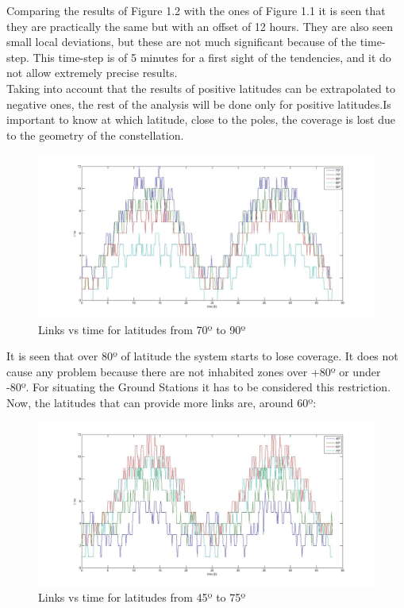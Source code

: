 Comparing the results of Figure 1.2 with the ones of Figure 1.1 it is seen that they are practically the same but with an offset of 12 hours. They are also seen small local deviations, but these are not much significant because of the time-step. This time-step is of 5 minutes for a first sight of the tendencies, and it do not allow extremely precise results.\\
Taking into account that the results of positive latitudes can be extrapolated to negative ones, the rest of the analysis will be done only for positive latitudes.Is important to know at which latitude, close to the poles, the coverage is lost due to the geometry of the constellation.
\begin{figure}[H]
\begin{center}
\includegraphics[scale=0.30]{70_5_90_lat.jpg}
\caption{Links vs time for latitudes from 70º to 90º}
\end{center}
\end{figure}
It is seen that over 80º of latitude the system starts to lose coverage. It does not cause any problem because there are not inhabited zones over +80º or under -80º. For situating the Ground Stations it has to be considered this restriction.\\
Now, the latitudes that can provide more links are, around 60º:
\begin{figure}[H]
\begin{center}
\includegraphics[scale=0.30]{45_10_75_lat.jpg}
\caption{Links vs time for latitudes from 45º to 75º}
\end{center}
\end{figure}
